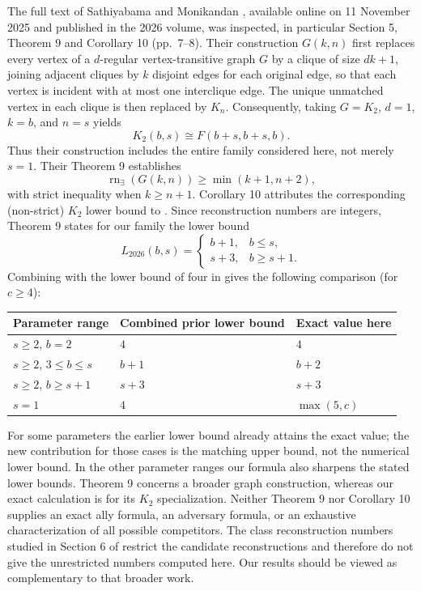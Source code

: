 \documentclass[11pt]{article}
\newcommand{\rn}{\operatorname{rn}}
\begin{document}
The full text of Sathiyabama and Monikandan \cite{SM}, available online on 11 November 2025 and published in the 2026 volume, was inspected, in particular Section 5, Theorem 9 and Corollary 10 (pp.~7--8). Their construction $G(k,n)$ first replaces every vertex of a $d$-regular vertex-transitive graph $G$ by a clique of size $dk+1$, joining adjacent cliques by $k$ disjoint edges for each original edge, so that each vertex is incident with at most one interclique edge. The unique unmatched vertex in each clique is then replaced by $K_n$. Consequently, taking $G=K_2$, $d=1$, $k=b$, and $n=s$ yields
\[
 K_2(b,s)\cong F(b+s,b+s,b).
\]
Thus their construction includes the entire family considered here, not merely $s=1$. Their Theorem 9 establishes
\[
 \rn_\exists(G(k,n))\geq\min(k+1,n+2),
\]
with strict inequality when $k\geq n+1$. Corollary 10 attributes the corresponding (non-strict) $K_2$ lower bound to \cite{HP}. Since reconstruction numbers are integers, Theorem 9 states for our family the lower bound
\[
 L_{2026}(b,s)=
 \begin{cases}
 b+1,&b\leq s,\\
 s+3,&b\geq s+1.
 \end{cases}
\]
Combining with the lower bound of four in \cite{MR} gives the following comparison (for $c\geq4$):
\begin{center}
\begin{tabular}{@{}lll@{}}
\toprule
Parameter range & Combined prior lower bound & Exact value here\\
\midrule
$s\geq2$, $b=2$ & $4$ & $4$\\
$s\geq2$, $3\leq b\leq s$ & $b+1$ & $b+2$\\
$s\geq2$, $b\geq s+1$ & $s+3$ & $s+3$\\
$s=1$ & $4$ & $\max(5,c)$\\
\bottomrule
\end{tabular}
\end{center}
For some parameters the earlier lower bound already attains the exact value; the new contribution for those cases is the matching upper bound, not the numerical lower bound. In the other parameter ranges our formula also sharpens the stated lower bounds. Theorem 9 concerns a broader graph construction, whereas our exact calculation is for its $K_2$ specialization. Neither Theorem 9 nor Corollary 10 supplies an exact ally formula, an adversary formula, or an exhaustive characterization of all possible competitors. The class reconstruction numbers studied in Section 6 of \cite{SM} restrict the candidate reconstructions and therefore do not give the unrestricted numbers computed here. Our results should be viewed as complementary to that broader work.
\end{document}
